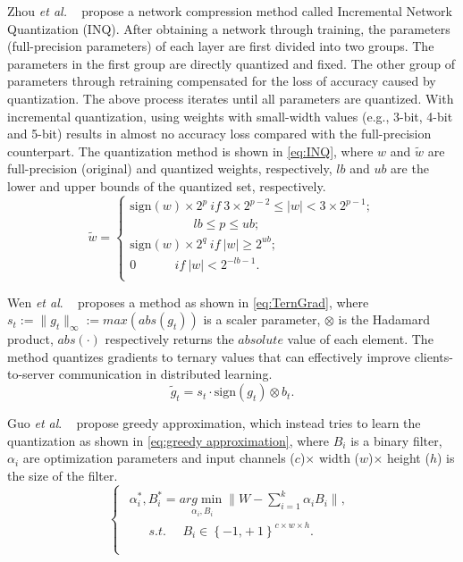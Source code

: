\documentclass[twoside,twocolumn]{article}
\begin{document}
Zhou \emph{et al.} ~\cite{b39} propose a network compression method called Incremental Network Quantization (INQ). After obtaining a network through training, the parameters (full-precision parameters) of each layer are first divided into two groups. The parameters in the first group are directly quantized and fixed. The other group of parameters through retraining compensated for the loss of accuracy caused by quantization. The above process iterates until all parameters are quantized. With incremental quantization, using weights with small-width values (e.g., 3-bit, 4-bit and 5-bit) results in almost no accuracy loss compared with the full-precision counterpart. The quantization method is shown in \eqref{eq:INQ}, where $w$ and $\tilde{w}$ are full-precision (original) and quantized weights, respectively, $lb$ and $ub$ are the lower and upper bounds of the quantized set, respectively.
\begin{equation}\label{eq:INQ}
\tilde{w}=\begin{cases}
	\text{sign} (w) \times 2^p\ if\ 3\times 2^{p-2}\leqslant |w|<3\times 2^{p-1};\\
	\ \ \ \ \ \ \ \ \ \ \ \ \ \ \ \ \ \ \ \ \ \ \ lb\leqslant p\leqslant ub;\\
	\text{sign} (w) \times 2^q\ if\ \left| w \right|\geqslant 2^{ub};\\
	\text{0}\ \ \ \ \ \ \ \ \ \ \ \ \ \ if\ |w|<2^{-lb-1}.\\
\end{cases}
\end{equation}



Wen \emph{et al}. ~\cite{b40} proposes a method as shown in \eqref{eq:TernGrad}, where $s_t:=\lVert g_t \rVert _{\infty}:=max(abs (g_t))$ is a scaler parameter, $\otimes$ is the Hadamard product, $abs(\cdot)$ respectively returns the $absolute$ value of each element. The method quantizes gradients to ternary values that can effectively improve clients-to-server communication in distributed learning.
\begin{equation}\label{eq:TernGrad}
\tilde{g}_t=s_t\cdot \mbox{sign} \left( g_t \right) \otimes b_t.
\end{equation}

Guo \emph{et al}. ~\cite{b41} propose greedy approximation, which instead tries to learn the quantization as shown in \eqref{eq:greedy approximation}, where $B_i$ is a binary filter, $\alpha_i$ are optimization parameters and input channels ($c$)$\times$ width ($w$)$\times$ height ($h$) is the size of the filter.
\begin{equation}\label{eq:greedy approximation}
\begin{cases}
	\begin{array}{l}
	\alpha _{i}^{*},B_{i}^{*}=\underset{\alpha _i,B_i}{arg\min}\lVert W-\sum_{i=1}^k{\alpha _iB_i}\rVert,\\
	\ \ \ \ \ \ \ s.t.\ \ \ \ \ \ B_i\in \left\{ -\text{1,}+1 \right\} ^{c\times w \times h}.\\
\end{array}\\
\end{cases}
\end{equation}
\end{document}
